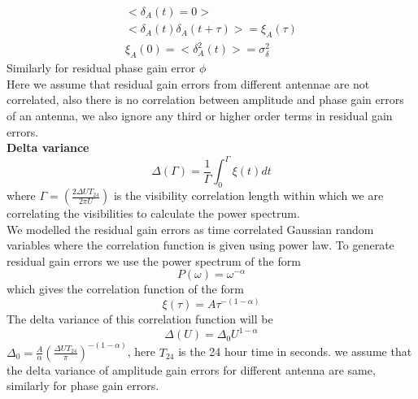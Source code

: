\documentclass[fleqn,usenatbib]{mnras}
\begin{document}
 \begin{equation}
 \begin{split}
     <\delta_A(t) = 0>\\<\delta_A(t) \delta_A(t+\tau)> = \xi_A(\tau)\\\xi_A(0) = <\delta^2_A(t)> = \sigma^2_{\delta}
 \end{split}
 \end{equation}
 Similarly for residual phase gain error $ \phi $\\
 Here we assume that residual gain errors from different antennae are not correlated, also there is no correlation between amplitude and phase gain errors of an antenna, we also ignore any third or higher order terms in residual gain errors.\\
 \textbf{Delta variance}
\begin{equation}
    \Delta(\Gamma) = \frac{1}{\Gamma} \int _0 ^{\Gamma} \xi (t) dt
\end{equation}
where $\Gamma = (\frac{2\Delta U T_{24}}{2\pi U})$ is the visibility correlation length within which we are correlating the visibilities to calculate the power spectrum.\\
We modelled the residual gain errors as time correlated Gaussian random variables where the correlation function is given using power law. To generate residual gain errors we use the power spectrum of the form
\begin{equation}
    P(\omega) = \omega ^{-\alpha}
\end{equation}
which gives the correlation function of the form
\begin{equation}
    \xi(\tau) = A\tau^{-(1-\alpha)}
\end{equation}
The delta variance of this correlation function will be
\begin{equation}
     \Delta(U) = \Delta_0 U^{1-\alpha}
\end{equation}
 $\Delta_0 = \frac{A}{\alpha} (\frac{\Delta U T_{24}}{\pi})^{-(1-\alpha)}$, here $T_{24}$ is the 24 hour time in seconds. 
 we assume that the delta variance of amplitude gain errors for different antenna are same, similarly for phase gain errors.\\
\end{document}
